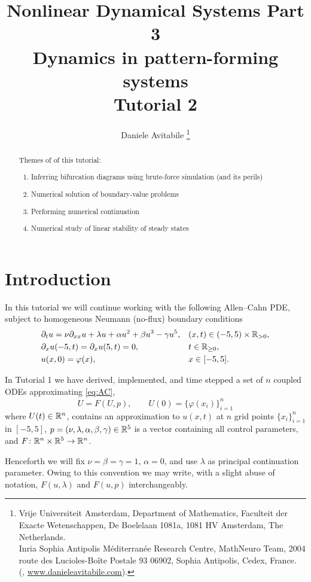 \documentclass[a4paper]{siamart220329}
\title{Nonlinear Dynamical Systems Part 3 \\ 
  Dynamics in pattern-forming systems \\
  Tutorial 2
}
\author{%
  Daniele Avitabile%
  \thanks{%
    Vrije Universiteit Amsterdam,
    Department of Mathematics,
    Faculteit der Exacte Wetenschappen,
    De Boelelaan 1081a,
    1081 HV Amsterdam, The Netherlands.
  \protect\\
    Inria Sophia Antipolis M\'editerran\'ee Research Centre,
    MathNeuro Team,
    2004 route des Lucioles-Boîte Postale 93 06902,
    Sophia Antipolis, Cedex, France.
  \protect\\
    (\email{d.avitabile@vu.nl}, \url{www.danieleavitabile.com}).
  }
}
\theoremstyle{plain}
\begin{document}
\maketitle

\begin{abstract}
  Themes of of this tutorial:
  \begin{enumerate}
    \item Inferring bifurcation diagrams using brute-force simulation (and its perils)
    \item Numerical solution of boundary-value problems
    \item Performing numerical continuation 
    \item Numerical study of linear stability of steady states
  \end{enumerate}
\end{abstract}

\section{Introduction}
In this tutorial we will continue working with the following Allen--Cahn PDE, subject to
homogeneous Neumann (no-flux) boundary conditions
\begin{equation}\label{eq:AC}
  \begin{aligned}
    & \partial_t u = \nu \partial_{xx}u + \lambda u + \alpha u^2 + \beta u^3 - \gamma
    u^5, & & (x,t) \in (-5,5) \times \RSet_{>0}, \\
	& \partial_x u(-5,t) = \partial_x u(5,t) = 0, && t \in \RSet_{\geq 0}, \\
	& u(x,0) = \varphi(x), && x \in [-5,5].
  \end{aligned}
\end{equation}

In Tutorial 1 we have derived, implemented, and time stepped a set of $n$ coupled ODEs
approximating \cref{eq:AC}, %
\begin{equation}
  \dot U = F(U,p), \qquad U(0) = \{ \varphi(x_i) \}_{i=1}^n
\end{equation}
where $U(t) \in \mathbb{R}^n$, contains an approximation to $u(x,t)$ at $n$ grid points 
$\{ x_i \}_{i=1}^n$ in $[-5,5]$, $p = (\nu,\lambda,\alpha,\beta,\gamma) \in \mathbb{R}^5$ is a
vector containing all control parameters, and $F \colon \mathbb{R}^n \times \mathbb{R}^5 \to
\mathbb{R}^n$. 

Henceforth we will fix $\nu = \beta = \gamma =1$, $\alpha=0$, and use $\lambda$ as
principal continuation parameter. Owing to this convention we may write, with a
slight abuse of notation, $F(u,\lambda)$ and $F(u,p)$ interchangeably.
\end{document}
